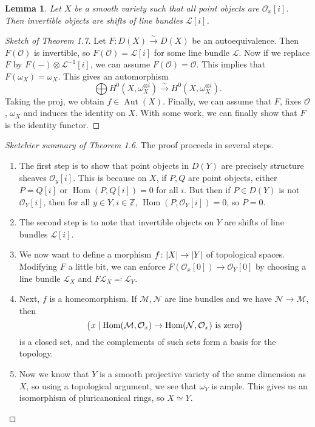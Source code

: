 \documentclass{amsart}
\newtheorem{lem}[thm]{Lemma}
\theoremstyle{definition}
\theoremstyle{remark}
\theoremstyle{plain}
\theoremstyle{definition}
\theoremstyle{remark}
\newcommand{\Z}{\mathbb{Z}}
\newcommand{\mc}[1]{\mathcal{#1}}
\newcommand{\1}{\mathbf{1}}
\newcommand{\2}{\mathbf{2}}
\newcommand{\3}{\mathbf{3}}
\DeclareMathOperator{\Hom}{Hom}
\DeclareMathOperator{\Aut}{Aut}
\begin{document}
\begin{lem}
    Let $X$ be a smooth variety such that all point objects are $\mc{O}_x[i]$. Then invertible objects are shifts of line bundles $\mc{L}[i]$.
\end{lem}

\begin{proof}[Sketch of Theorem 1.7]
    Let $F \colon D(X) \xrightarrow{\sim} D(X)$ be an autoequivalence. Then $F(\mc{O})$ is invertible, so $F(\mc{O}) = \mc{L}[i]$ for some line bundle $\mc{L}$. Now if we replace $F$ by $F(-) \otimes \mc{L}^{-1}[i]$, we can assume $F(\mc{O}) = \mc{O}$. This implies that $F(\omega_X) = \omega_X$. This gives an automorphism
    \[ \bigoplus H^0(X, \omega_X^{\otimes i}) \xrightarrow{\sim} H^0(X, \omega_X^{\otimes i}). \]
    Taking the proj, we obtain $f \in \Aut(X)$. Finally, we can assume that $F$, fixes $\mc{O}$, $\omega_X$ and induces the identity on $X$. With some work, we can finally show that $F$ is the identity functor.
\end{proof}

\begin{proof}[Sketchier summary of Theorem 1.6]
    The proof proceeds in several steps.
    \begin{enumerate}
        \item The first step is to show that point objects in $D(Y)$ are precisely structure sheaves $\mc{O}_y[i]$. This is because on $X$, if $P, Q$ are point objects, either $P = Q[i]$ or $\Hom(P,Q[i]) = 0$ for all $i$. But then if $P \in D(Y)$ is not $\mc{O}_Y[i]$, then for all $y \in Y, i \in \Z$, $\Hom(P, \mc{O}_Y[i]) = 0$, so $P = 0$.
        \item The second step is to note that invertible objects on $Y$ are shifts of line bundles $\mc{L}[i]$.
        \item We now want to define a morphism $f \colon \abs{X} \to \abs{Y}$ of topological spaces. Modifying $F$ a little bit, we can enforce $F(\mc{O}_x[0]) \to \mc{O}_Y[0]$ by choosing a line bundle $\mc{L}_X$ and $F \mc{L}_X \eqqcolon \mc{L}_Y$.
        \item Next, $f$ is a homeomorphism. If $\mc{M}, \mc{N}$ are line bundles and we have $\mc{N} \to \mc{M}$, then 
            \[ \qty{x \mid \Hom(\mc{M}, \mc{O}_x) \to \Hom(\mc{N}, \mc{O}_x) \text{ is zero}} \]
            is a closed set, and the complements of such sets form a basis for the topology.
        \item Now we know that $Y$ is a smooth projective variety of the same dimension as $X$, so using a topological argument, we see that $\omega_Y$ is ample. This gives us an isomorphism of pluricanonical rings, so $X \simeq Y$. \qedhere
    \end{enumerate}
\end{proof}
\end{document}
